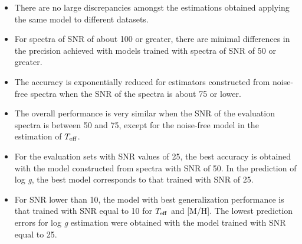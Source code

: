 \documentclass[a4paper,fleqn,usenatbib]{mnras}
\begin{document}
\begin{itemize}
\item There are no large discrepancies amongst the estimations 
	obtained applying the same model to different datasets.
\item For spectra of SNR of about 100 or greater, there are minimal
  differences in the precision achieved with models trained with
  spectra of SNR of 50 or greater.
\item The accuracy is exponentially reduced for estimators
  constructed from noise-free spectra when the SNR of the spectra is
  about 75 or lower.
\item The overall performance is very similar when the SNR of the
  evaluation spectra is between 50 and 75, except for the noise-free
  model in the estimation of $T_{\rm eff}$. 
\item For the evaluation sets with SNR values of 25, the best accuracy
  is obtained with the model constructed from spectra with SNR of 50. 
  In the prediction of log \textit{g}, the best model corresponds to 
  that trained with SNR of 25.
\item For SNR lower than 10, the model with best generalization
  performance is that trained with SNR equal to 10 for $T_{\rm eff}$ 
  and [M/H]. The lowest prediction errors for log \textit{g} estimation 
  were obtained with the model trained with SNR equal to 25.
\end{itemize}
\end{document}
